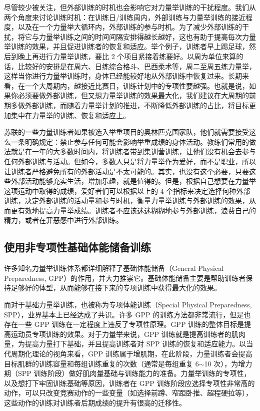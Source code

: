 \documentclass[fontset=fandol, a4paper, 12pt, openright]{ctexbook}
\begin{document}
尽管较少被关注，但外部训练的时机也会影响它对力量举训练的干扰程度。我们从两个角度来讨论训练时机：在训练日/训练周内，外部训练与力量举训练的接近程度，以及在一个力量举大循环内，外部训练的参与时机。为了减少外部训练的干扰，将它与力量举训练之间的时间间隔安排得越长越好，这也有助于提高每次力量举训练的效果，并且促进训练者的恢复和适应。举个例子，训练者早上踢足球，然后到晚上再进行力量举训练，要比 2 个项目紧接着练要好。以周为单位来算的话，比较好的安排是在周六、日练综合格斗、巴西柔术等，周二至周五练力量举，这样当你进行力量举训练时，身体已经能较好地从外部训练中恢复过来。长期来看，在一个大周期内，越接近比赛日，训练计划中的专项性要越强。也就是说，如果你必须要做外部训练，但又想力量举训练的效果最大化，我们建议在大周期的前期多做外部训练，而随着力量举计划的推进，不断降低外部训练的占比，将目标更加集中在力量举的训练、恢复和适应上。

苏联的一些力量训练者如果被选入举重项目的奥林匹克国家队，他们就需要接受这么一条明确规定：禁止参与任何可能会影响举重成绩的身体活动。教练们常用的做法就是在一年的大多数时间内，将训练者带到集训营训练，让他们没有机会去参与任何外部训练与活动。但如今，多数人只是将力量举作为爱好，而不是职业，所以让训练者严格避免所有的外部活动是不太可能的。其实，也没有这个必要，只要这些外部活动能够充实生活，增加乐趣，就是值得的。但是，根据自己想要在力量举这项运动中取得的成绩，爱好者们可以根据以上的 4 个指标来决定选择何种外部训练，决定外部训练的活动量和参与时机，衡量力量举训练与外部训练的效果，从而更有效地提高力量举成绩。训练者不应该迷迷糊糊地参与外部训练，浪费自己的精力，或者在罪恶感中进行外部训练。

\subsection{使用非专项性基础体能储备训练}

许多知名力量举训练体系都详细解释了基础体能储备（General Physical Preparedness, GPP）的作用，并大力推崇它。基础体能储备主要是帮助训练者保持足够好的体型，从而能够在接下来的专项训练中获得最大化的效果。

而对于基础力量举训练，也被称为专项体能训练（Special Physical Preparedness, SPP），业界基本上已经达成了共识。许多 GPP 的训练方法都非常流行，但是也存在一些 GPP 训练在一定程度上违反了专项性原理。GPP 训练的整体目标是提高运动员专项训练的效果。对于力量举来说，GPP 训练就是提高训练者的肌肉量，为提高力量打下基础，并且提高训练者对 SPP 训练的恢复和适应能力。以当代周期化理论的视角来看，GPP 训练属于增肌期，在此阶段，力量训练者会提高目标肌群的训练容量和每组训练重复的次数（通常是每组重复 6$\sim$10 次），为增力期（SPP 训练阶段）做好肌肉量基础与训练能力的准备。力量举训练的专项性，以及想打下牢固训练基础等原因，训练者在 GPP 训练阶段应选择专项性非常高的动作，可以只改变竞赛动作的一些变量（如选择前蹲、窄距卧推、超程硬拉等），这些动作的训练对训练者后期成绩的提升有很高的迁移性。
\end{document}

